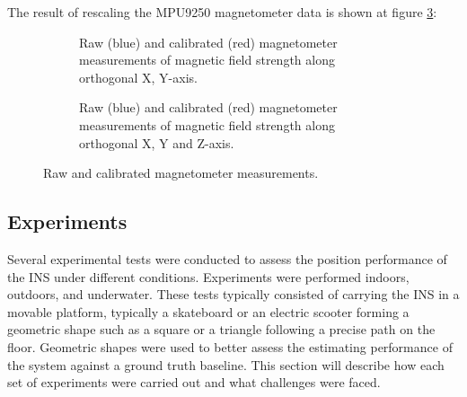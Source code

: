 The result of rescaling the MPU9250 magnetometer data is shown at figure \ref{fig:mag_calibration_output}:

\begin{figure}[!h]
  \centering
  \begin{subfigure}{0.49\textwidth}
    \centering
    \resizebox{1\linewidth}{!}{}
    \caption{Raw (blue) and calibrated (red) magnetometer measurements of magnetic field strength along orthogonal X, Y-axis.}
    \label{fig:magnetometer_calibrated2D}
  \end{subfigure}
  \begin{subfigure}{0.49\textwidth}
    \centering
    \resizebox{1\linewidth}{!}{}
    \caption{Raw (blue) and calibrated (red) magnetometer measurements of magnetic field strength along orthogonal X, Y and Z-axis.}
    \label{fig:magnetometer_calibrated3D}
  \end{subfigure}
  \caption{Raw and calibrated magnetometer measurements.}
  \label{fig:mag_calibration_output}
\end{figure}

\newpage




\subsection{Experiments}
\label{sub:experiments}

Several experimental tests were conducted to assess the position performance of the INS under different conditions. Experiments were performed indoors, outdoors, and underwater. These tests typically consisted of carrying the INS in a movable platform, typically a skateboard or an electric scooter forming a geometric shape such as a square or a triangle following a precise path on the floor. Geometric shapes were used to better assess the estimating performance of the system against a ground truth baseline. This section will describe how each set of experiments were carried out and what challenges were faced.

